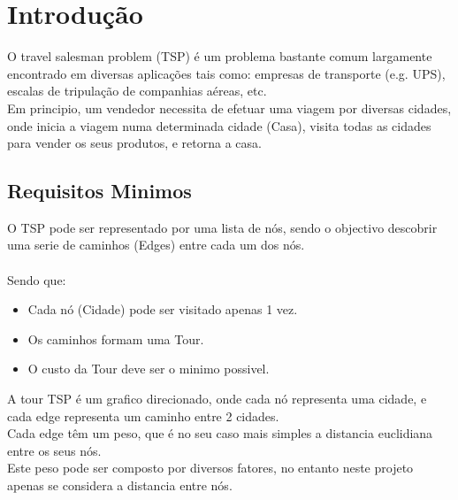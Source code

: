 \documentclass[12pt,a4paper,portrait]{article}
\begin{document}
	
	\tableofcontents
	
	
	\newpage
	\section{Introdução}
		O travel salesman problem (TSP) é um problema bastante comum largamente encontrado em diversas aplicações tais como: empresas de transporte (e.g. UPS), escalas de tripulação de companhias aéreas, etc.\\
		Em principio, um vendedor necessita de efetuar uma viagem por diversas cidades, onde inicia a viagem numa determinada cidade (Casa), visita todas as cidades para vender os seus produtos, e retorna a casa.\\
		\subsection{Requisitos Minimos}	
			O TSP pode ser representado por uma lista de nós, sendo o objectivo descobrir uma serie de caminhos (Edges) entre cada um dos nós.\\\\
			Sendo que:\\
			\begin{itemize}
				\item Cada nó (Cidade) pode ser visitado apenas 1 vez.
				\item Os caminhos formam uma Tour.
				\item O custo da Tour deve ser o minimo possivel.
			\end{itemize}
			A tour TSP é um grafico direcionado, onde cada nó representa uma cidade, e cada edge representa um caminho entre 2 cidades.\\
			Cada edge têm um peso, que é no seu caso mais simples a distancia euclidiana entre os seus nós.\\
			Este peso pode ser composto por diversos fatores, no entanto neste projeto apenas se considera a distancia entre nós.\\ 			
\end{document}
